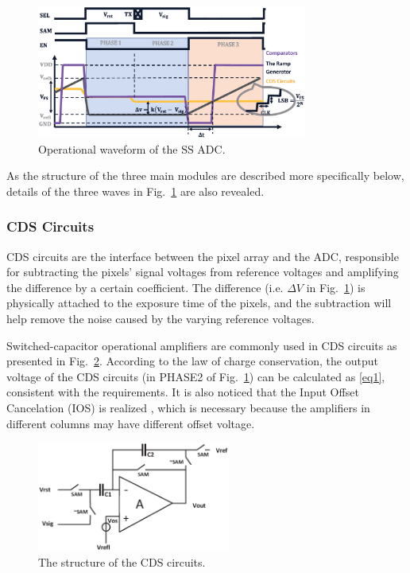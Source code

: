 \begin{figure}[htbp]
	\centerline{\includegraphics[width=3.5in]{./Figures/SSWAVE.eps}}
	\caption{Operational waveform of the SS ADC.}
	\label{SSWAVE}
\end{figure}

As the structure of the three main modules are described more specifically below, details of the three waves in Fig.~\ref{SSWAVE} are also revealed.

\subsubsection{CDS Circuits}

CDS circuits are the interface between the pixel array and the ADC, responsible for subtracting the pixels’ signal voltages from reference voltages and 
amplifying the difference by a certain coefficient. The difference (i.e. $\Delta{V}$ in Fig.~\ref{SSWAVE}) is physically attached to the exposure time of the pixels, 
and the subtraction will help remove the noise caused by the varying reference voltages. 

Switched-capacitor operational amplifiers are commonly used in CDS circuits as presented in Fig.~\ref{CDS}. According to the law of charge conservation, 
the output voltage of the CDS circuits (in PHASE2 of Fig.~\ref{SSWAVE}) can be calculated as \eqref{eq1}, consistent with the requirements. It is also noticed that the Input Offset Cancelation (IOS) is realized \cite{razavi_design_1992}, 
which is necessary because the amplifiers in different columns may have different offset voltage.

\begin{figure}[htbp]
	\centerline{\includegraphics[width=2.5in]{./Figures/CDS.eps}}
	\caption{The structure of the CDS circuits.}
	\label{CDS}
\end{figure} 

